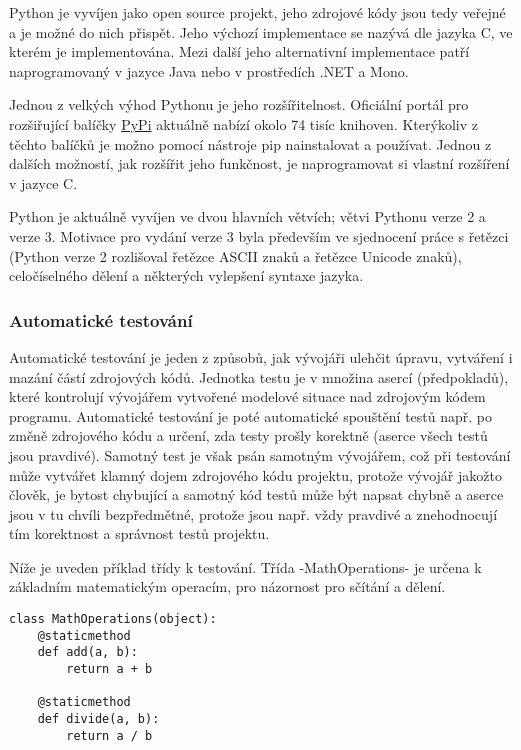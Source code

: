 \documentclass[10pt,titlepage,a4paper]{extarticle}
\makeatletter
\newcommand\ic[1][green]{%
    \@testopt{\@ic{#1}}{-#1}%
}
\def\@ic#1[#2]{%
    \Collectverb{\@@ic{#1}{#2}}%
}
\def\@@ic#1#2#3{%
    \fcolorbox{white}{lightgray}{\lstinline[basicstyle=\ttfamily\color{violet},breaklines=true]|#3|}%
}
\makeatother
\begin{document}
Python je vyvíjen jako open source projekt, jeho zdrojové kódy jsou tedy veřejné a je možné do nich přispět. Jeho výchozí implementace se nazývá  dle jazyka C, ve kterém je implementována. Mezi další jeho alternativní implementace patří  naprogramovaný v jazyce Java nebo  v prostředích .NET a Mono.

Jednou z velkých výhod Pythonu je jeho rozšířitelnost. Oficiální portál pro rozšiřující balíčky \href{https:\/\/pypi.python.org\/pypi}{PyPi} aktuálně nabízí okolo 74 tisíc knihoven. Kterýkoliv z těchto balíčků je možno pomocí nástroje pip nainstalovat a používat. Jednou z dalších možností, jak rozšířit jeho funkčnost, je naprogramovat si vlastní rozšíření v jazyce C.

Python je aktuálně vyvíjen ve dvou hlavních větvích; větvi Pythonu verze 2 a verze 3. Motivace pro vydání verze 3 byla především ve sjednocení práce s řetězci (Python verze 2 rozlišoval řetězce ASCII znaků a řetězce Unicode znaků), celočíselného dělení a některých vylepšení syntaxe jazyka.

\subsubsection{Automatické testování}

Automatické testování je jeden z způsobů, jak vývojáři ulehčit úpravu, vytváření i mazání částí zdrojových kódů. Jednotka testu je v množina asercí (předpokladů), které kontrolují vývojářem vytvořené modelové situace nad zdrojovým kódem programu. Automatické testování je poté automatické spouštění testů např. po změně zdrojového kódu a určení, zda testy prošly korektně (aserce všech testů jsou pravdivé). Samotný test je však psán samotným vývojářem, což při testování může vytvářet klamný dojem  zdrojového kódu projektu, protože vývojář jakožto člověk, je bytost chybující a samotný kód testů může být napsat chybně a aserce jsou v tu chvíli bezpředmětné, protože jsou např. vždy pravdivé a znehodnocují tím korektnost  a správnost testů projektu.

Níže je uveden příklad třídy k testování. Třída \ic-MathOperations- je určena k základním matematickým operacím, pro názornost pro sčítání a dělení. 
\begin{lstlisting}
class MathOperations(object):
	@staticmethod
	def add(a, b):
		return a + b

	@staticmethod
	def divide(a, b):
		return a / b
\end{lstlisting}
\end{document}
